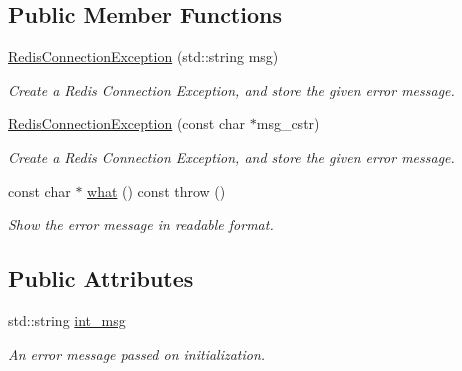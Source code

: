 \subsection*{Public Member Functions}
\begin{DoxyCompactItemize}
\item 
\hypertarget{structRedisConnectionException_a1a28a564f37ca6c032222fc57611fe7d}{\hyperlink{structRedisConnectionException_a1a28a564f37ca6c032222fc57611fe7d}{Redis\-Connection\-Exception} (std\-::string msg)}\label{structRedisConnectionException_a1a28a564f37ca6c032222fc57611fe7d}

\begin{DoxyCompactList}\small\item\em Create a Redis Connection Exception, and store the given error message. \end{DoxyCompactList}\item 
\hypertarget{structRedisConnectionException_a5af84b976ba7c84d4891c8b42d0c0b34}{\hyperlink{structRedisConnectionException_a5af84b976ba7c84d4891c8b42d0c0b34}{Redis\-Connection\-Exception} (const char $\ast$msg\-\_\-cstr)}\label{structRedisConnectionException_a5af84b976ba7c84d4891c8b42d0c0b34}

\begin{DoxyCompactList}\small\item\em Create a Redis Connection Exception, and store the given error message. \end{DoxyCompactList}\item 
\hypertarget{structRedisConnectionException_a309897cb6e68eea573b2db478543cb16}{const char $\ast$ \hyperlink{structRedisConnectionException_a309897cb6e68eea573b2db478543cb16}{what} () const   throw ()}\label{structRedisConnectionException_a309897cb6e68eea573b2db478543cb16}

\begin{DoxyCompactList}\small\item\em Show the error message in readable format. \end{DoxyCompactList}\end{DoxyCompactItemize}
\subsection*{Public Attributes}
\begin{DoxyCompactItemize}
\item 
\hypertarget{structRedisConnectionException_a95af5cf7df2c6dda75b37574a6cafba4}{std\-::string \hyperlink{structRedisConnectionException_a95af5cf7df2c6dda75b37574a6cafba4}{int\-\_\-msg}}\label{structRedisConnectionException_a95af5cf7df2c6dda75b37574a6cafba4}

\begin{DoxyCompactList}\small\item\em An error message passed on initialization. \end{DoxyCompactList}\end{DoxyCompactItemize}



